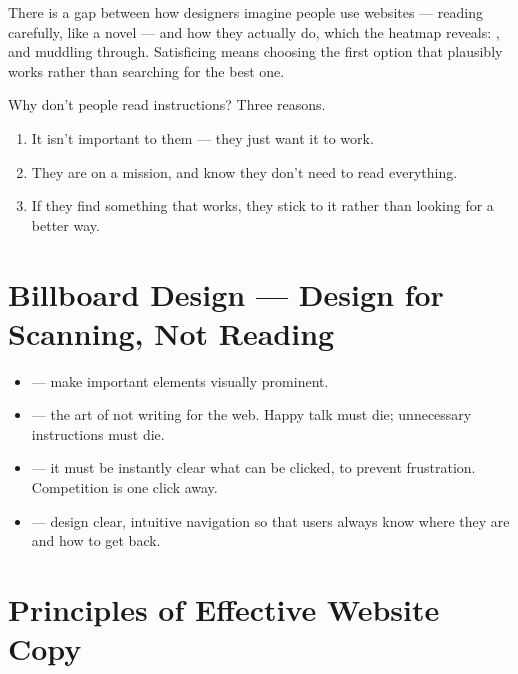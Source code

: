 \documentclass{MMTextbook}
\begin{document}
There is a gap between how designers imagine people use websites --- reading
carefully, like a novel --- and how they actually do, which the heatmap reveals:
,  and muddling through. Satisficing means
choosing the first option that plausibly works rather than searching for the best
one.

\noindent Why don't people read instructions? Three reasons.

\begin{enumerate}
\item It isn't important to them --- they just want it to work.
\item They are on a mission, and know they don't need to read everything.
\item If they find something that works, they stick to it rather than looking for
      a better way.
\end{enumerate}

\section{Billboard Design --- Design for Scanning, Not Reading}

\begin{itemize}
\item {} --- make important elements visually
      prominent.
\item {} --- the art of not writing for the web. Happy talk
      must die; unnecessary instructions must die.
\item {} --- it must be instantly clear what can be
      clicked, to prevent frustration. Competition is one click away.
\item {} --- design clear, intuitive
      navigation so that users always know where they are and how to get back.
\end{itemize}

\section{Principles of Effective Website Copy}
\end{document}

